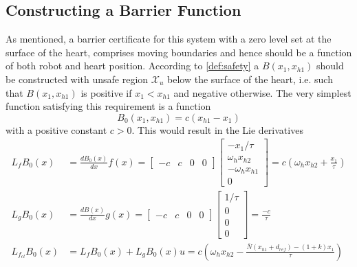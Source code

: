 \subsection{Constructing a Barrier Function}
As mentioned, a barrier certificate for this system with a zero level set at the surface of the heart, comprises moving boundaries and hence should be a function of both robot and heart position. According to \autoref{def:safety} a $B(x_1,x_{h1})$ should be constructed with unsafe region $\mathcal{X}_u$ below the surface of the heart, i.e. such that $B(x_1,x_{h1})$ is positive if $x_1<x_{h1}$ and negative otherwise. The very simplest function satisfying this requirement is a function
\begin{equation}
B_0(x_1,x_{h1})= c(x_{h1}-x_1)
\end{equation}
with a positive constant $c>0$. This would result in the Lie derivatives %
\begin{subequations}
\begin{align}
L_fB_0(x) &= \frac{dB_0(x)}{dx}f(x) =
\begin{bmatrix}
-c & c & 0 & 0
\end{bmatrix}
\begin{bmatrix}
-x_1/\tau\\
\omega_h x_{h2} \\
-\omega_h x_{h1} \\
0
\end{bmatrix}=
c\left(\omega_h x_{h2} + \frac{ x_1}{\tau}\right)\\
L_gB_0(x) &= \frac{dB(x)}{dx}g(x) =
\begin{bmatrix}
-c & c & 0 & 0
\end{bmatrix}
\begin{bmatrix}
1/\tau\\
0 \\ 0 \\ 0
\end{bmatrix}=
\frac{-c}{\tau}\\
L_{f_{cl}}B_0(x) & 
= L_fB_0(x)+L_gB_0(x)u = 
c\left(\omega_h x_{h2} - \frac{\bar{N}(x_{h1} + d_{ref})-(1+k) x_1}{\tau}\right)
\end{align}
\end{subequations}
